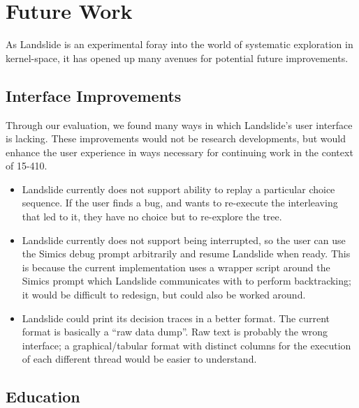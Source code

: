 \section{Future Work}
\label{sec:future}

As Landslide is an experimental foray into the world of systematic exploration in kernel-space, it has opened up many avenues for potential future improvements.

\subsection{Interface Improvements}
\label{sec:future-interface}

Through our evaluation, we found many ways in which Landslide's user interface is lacking. These improvements would not be research developments, but would enhance the user experience in ways necessary for continuing work in the context of 15-410.

\begin{itemize}
	\item Landslide currently does not support ability to replay a particular choice sequence. If the user finds a bug, and wants to re-execute the interleaving that led to it, they have no choice but to re-explore the tree.
	\item Landslide currently does not support being interrupted, so the user can use the Simics debug prompt arbitrarily and resume Landslide when ready. This is because the current implementation uses a wrapper script around the Simics prompt which Landslide communicates with to perform backtracking; it would be difficult to redesign, but could also be worked around.
	\item Landslide could print its decision traces in a better format. The current format is basically a ``raw data dump''. Raw text is probably the wrong interface; a graphical/tabular format with distinct columns for the execution of each different thread would be easier to understand.
\end{itemize}

\subsection{Education}
\label{sec:future-education}

